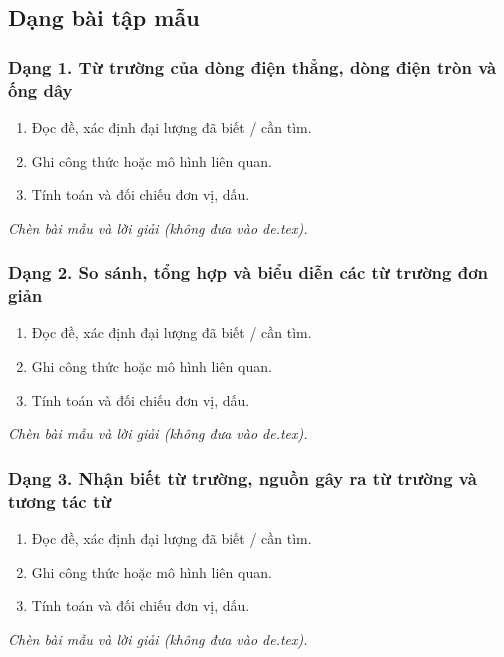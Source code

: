 

\subsection{Dạng bài tập mẫu}
\subsubsection{Dạng 1. Từ trường của dòng điện thẳng, dòng điện tròn và ống dây}
\begin{phuongphap}
\begin{enumerate}
\item Đọc đề, xác định đại lượng đã biết / cần tìm.
\item Ghi công thức hoặc mô hình liên quan.
\item Tính toán và đối chiếu đơn vị, dấu.
\end{enumerate}
\end{phuongphap}
\begin{vidumau}
\textit{Chèn bài mẫu và lời giải (không đưa vào de.tex).}
\end{vidumau}

\subsubsection{Dạng 2. So sánh, tổng hợp và biểu diễn các từ trường đơn giản}
\begin{phuongphap}
\begin{enumerate}
\item Đọc đề, xác định đại lượng đã biết / cần tìm.
\item Ghi công thức hoặc mô hình liên quan.
\item Tính toán và đối chiếu đơn vị, dấu.
\end{enumerate}
\end{phuongphap}
\begin{vidumau}
\textit{Chèn bài mẫu và lời giải (không đưa vào de.tex).}
\end{vidumau}

\subsubsection{Dạng 3. Nhận biết từ trường, nguồn gây ra từ trường và tương tác từ}
\begin{phuongphap}
\begin{enumerate}
\item Đọc đề, xác định đại lượng đã biết / cần tìm.
\item Ghi công thức hoặc mô hình liên quan.
\item Tính toán và đối chiếu đơn vị, dấu.
\end{enumerate}
\end{phuongphap}
\begin{vidumau}
\textit{Chèn bài mẫu và lời giải (không đưa vào de.tex).}
\end{vidumau}

